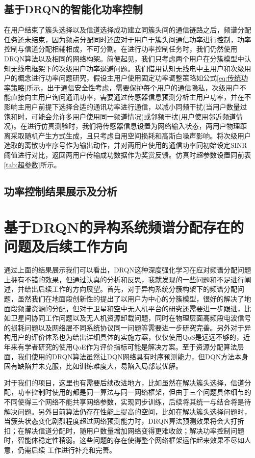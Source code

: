 \subsection{基于DRQN的智能化功率控制}
在用户结束了簇头选择以及信道选择成功建立同簇头间的通信链路之后，频谱分配任务还未结束，因为频点分配同时还应对于用户于簇头间通信功率进行控制，功率控制与信道分配相辅相成，不可分割。在进行功率控制任务时，我们仍然使用DRQN算法以及相同的网络构架。简便起见，我们只考虑两个用户在分簇模型中认知无线电框架下的次级用户功率退避问题。我们借用认知无线电中主用户和次级用户的概念进行功率问题研究，假设主用户使用固定功率调整策略如公式\ref{eq:传统功率策略}所示，出于通信安全性考虑，需要保护每个用户的通信隐私，次级用户不能直接向主用户询问通讯功率，需要通过传感器信息预测分析主用户功率，并在不影响主用户前提下选择合适的通讯功率进行通信，以减小同频干扰(当用户数量过饱和时，可能会允许多用户使用同一频道情况)或邻频干扰(用户使用邻近频道情况)。在进行仿真测验时，我们将传感器信息设置为网络输入状态，两用户物理距离采取随机产生方式生成，且只考虑自用空间损耗和高斯白噪声影响。将次级用户选取的离散功率序号作为输出动作，并对两用户使用的通信功率同初始设定SINR阈值进行对比，返回两用户传输成功数据作为奖赏反馈。仿真时超参数设置同前表\ref{tab:超参数}所示。

\subsection{功率控制结果展示及分析}

\section{基于DRQN的异构系统频谱分配存在的问题及后续工作方向}
通过上面的结果展示我们可以看出，DRQN这种深度强化学习在应对频谱分配问题上拥有不错的效果，但通过认真的分析和反思，我就发现的一些问题和不足进行阐述，并给出后续工作的方向展望。首先，对于异构系统分簇构架下的频谱分配问题，虽然我们在地面段创新性的提出了以用户为中心的分簇模型，很好的解决了地面段频谱资源的分配，但对于卫星和空中无人机平台的研究还需要进一步跟进，比如卫星间协同工作问题以及无人机资源卸载问题，同时在物理层面高频段电波信号的损耗问题以及网络层不同系统协议同一问题等需要进一步研究完善。另外对于异构用户的评价体系也为给出详细具体的实施方案，仅仅使用QoS是远远不够的，近年来有学者研究的使用QoE作为评价指标可能是解决方案。至于资源分配算法层面，我们使用的DRQN算法虽然让DQN网络具有时序预测能力，但DQN方法本身固有缺陷并未克服，比如训练难度大，易陷入局部最优解。

对于我们的项目，这里也有需要后续改进地方，比如虽然在解决簇头选择，信道分配，功率控制时使用的都是同一算法与同一网络框架，但由于三个问题具体细节的不同使得三个网络不能共享网络参数，实现同步训练，后续将其统一与结合将是待解决问题。另外目前算法仍存在性能上提高的空间，比如在解决簇头选择问题时，当簇头状态变化剧烈程度超过网络预测能力时，DRQN算法预测效果将会大打折扣；在解决信道分配时，随用户数量增加网络变得更难收敛；解决功率控制问题时，智能体稳定性稍弱。这些问题的存在使得整个网络框架运作起来效果不尽如人意，仍需后续 工作进行补充和完善。

